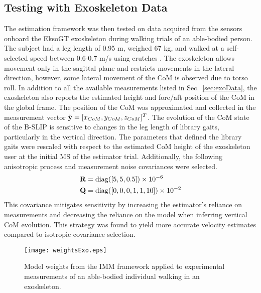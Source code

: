\subsection{Testing with Exoskeleton Data}

The estimation framework was then tested on data acquired from the sensors onboard the EksoGT exoskeleton during walking trials of an able-bodied person. The subject had a leg length of 0.95 m, weighed 67 kg, and walked at a self-selected speed between 0.6-0.7 m/s using crutches \cite{gambon2019characterizing}. The exoskeleton allows movement only in the sagittal plane and restricts movements in the lateral direction, however, some lateral movement of the CoM is observed due to torso roll. In addition to all the available measurements listed in Sec.~\ref{sec:exoData}, the exoskeleton also reports the estimated height and fore/aft position of the CoM in the global frame. The position of the CoM was approximated and collected in the measurement vector $ \tilde{\mathbf{y}} = [x_{CoM} ,y_{CoM} ,z_{CoM}]^T $. The evolution of the CoM state of the B-SLIP is sensitive to changes in the leg length of library gaits, particularly in the vertical direction. The parameters that defined the library gaits were rescaled with respect to the estimated CoM height of the exoskeleton user at the initial MS of the estimator trial. Additionally, the following anisotropic process and measurement noise covariances were selected.
\begin{align}
		\mathbf{R} &= {\rm diag}([5,5,0.5])\times 10^{-6} \\
		\mathbf{Q} &={\rm diag}([0,0,0,1,1,10])\times 10^{-2}
\end{align}
This covariance mitigates sensitivity by increasing the estimator's reliance on measurements and decreasing the reliance on the model when inferring vertical CoM evolution. This strategy was found to yield more accurate velocity estimates compared to isotropic covariance selection. 

\begin{figure}
	\centering
	\texttt{[image: weightsExo.eps]}
	\caption{Model weights from the IMM framework applied to experimental measurements of an able-bodied individual walking in an exoskeleton.}\label{fig:exoWeights}
\end{figure}

